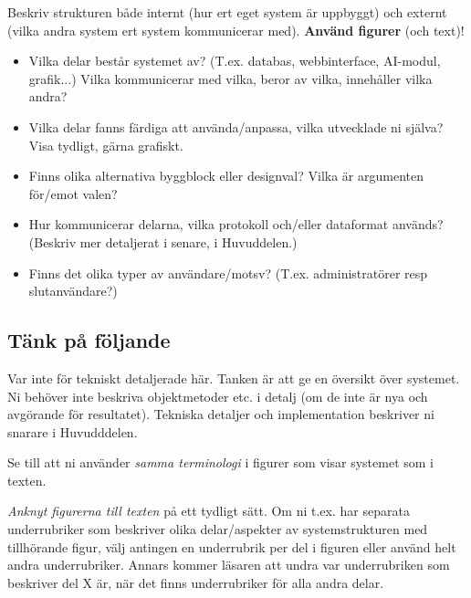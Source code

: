 Beskriv strukturen både internt (hur ert eget system är uppbyggt) och externt (vilka andra system ert system kommunicerar med). \textbf{Använd figurer} (och text)!
\begin{itemize}
\item Vilka delar består systemet av? (T.ex. databas, webbinterface, AI-modul, grafik...) Vilka kommunicerar med vilka, beror av vilka, innehåller vilka andra?
\item Vilka delar fanns färdiga att använda/anpassa, vilka utvecklade ni själva? Visa tydligt, gärna grafiskt.
\item Finns olika alternativa byggblock eller designval? Vilka är argumenten för/emot valen?
\item Hur kommunicerar delarna, vilka protokoll och/eller dataformat används? (Beskriv mer detaljerat i senare, i Huvuddelen.)
\item Finns det olika typer av användare/motsv? (T.ex. administratörer resp slut\-an\-vän\-dare?)
\end{itemize}

\subsection{Tänk på följande}

Var inte för tekniskt detaljerade här.  Tanken är att ge en översikt över systemet.  Ni behöver inte beskriva objektmetoder etc. i detalj (om de inte är nya och avgörande för resultatet). Tekniska detaljer och implementation beskriver ni snarare i Huvudddelen.

Se till att ni använder \emph{samma terminologi} i figurer som visar systemet som i texten. 

\emph{Anknyt figurerna till texten} på ett tydligt sätt. Om ni t.ex. har separata underrubriker som beskriver olika delar/aspekter av systemstrukturen med tillhörande figur, välj antingen en underrubrik per del i figuren eller använd helt andra underrubriker.  Annars kommer läsaren att undra var underrubriken som beskriver del X är, när det finns underrubriker för alla andra delar.


